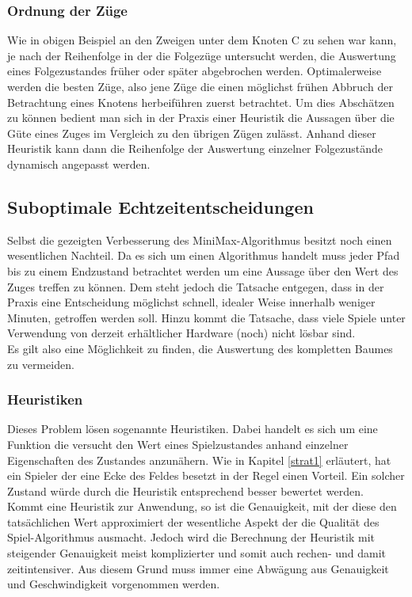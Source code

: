 \subsubsection{Ordnung der Züge}
Wie in obigen Beispiel an den Zweigen unter dem Knoten C zu sehen war kann, je nach der Reihenfolge in der die Folgezüge untersucht werden, die Auswertung eines Folgezustandes früher oder später abgebrochen werden. Optimalerweise werden die besten Züge, also jene Züge die einen möglichst frühen Abbruch der Betrachtung eines Knotens herbeiführen zuerst betrachtet. Um dies Abschätzen zu können bedient man sich in der Praxis einer Heuristik die Aussagen über die Güte eines Zuges im Vergleich zu den übrigen Zügen zulässt. Anhand dieser Heuristik kann dann die Reihenfolge der Auswertung einzelner Folgezustände dynamisch angepasst werden.

\subsection{Suboptimale Echtzeitentscheidungen}
Selbst die gezeigten Verbesserung des MiniMax-Algorithmus besitzt noch einen wesentlichen Nachteil. Da es sich um einen  Algorithmus handelt muss jeder Pfad bis zu einem Endzustand betrachtet werden um eine Aussage über den Wert des Zuges treffen zu können. Dem steht jedoch die Tatsache entgegen, dass in der Praxis eine Entscheidung möglichst schnell, idealer Weise innerhalb weniger Minuten, getroffen werden soll. Hinzu kommt die Tatsache, dass viele Spiele unter Verwendung von derzeit erhältlicher Hardware (noch) nicht lösbar sind.\\
Es gilt also eine Möglichkeit zu finden, die Auswertung des kompletten Baumes zu vermeiden.

\subsubsection{Heuristiken}
\label{Heuristiken}
Dieses Problem lösen sogenannte Heuristiken. Dabei handelt es sich um eine Funktion die versucht den Wert eines Spielzustandes anhand einzelner Eigenschaften des Zustandes anzunähern. Wie in Kapitel \ref{strat1} erläutert, hat ein Spieler der eine Ecke des Feldes besetzt in der Regel einen Vorteil. Ein solcher Zustand würde durch die Heuristik entsprechend besser bewertet werden.\\
Kommt eine Heuristik zur Anwendung, so ist die Genauigkeit, mit der diese den tatsächlichen Wert approximiert der wesentliche Aspekt der die Qualität des Spiel-Algorithmus ausmacht. Jedoch wird die Berechnung der Heuristik mit steigender Genauigkeit meist komplizierter und somit auch rechen- und damit zeitintensiver. Aus diesem Grund muss immer eine Abwägung aus Genauigkeit und Geschwindigkeit vorgenommen werden. 

